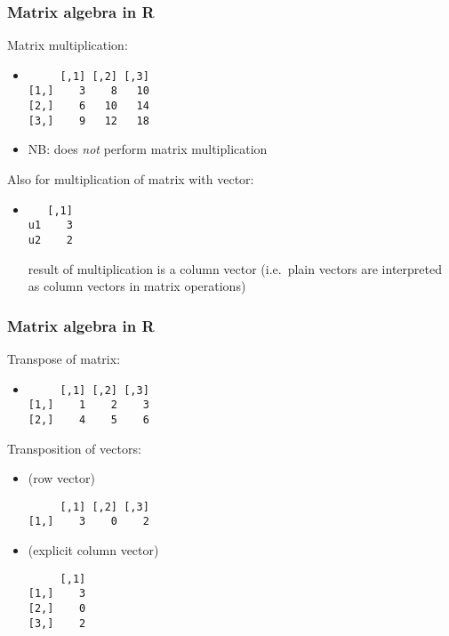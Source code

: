 \begin{frame}[containsverbatim]
  \frametitle{Matrix algebra in R}
  
  Matrix multiplication:
  \begin{itemize}
  \item {}
    \begin{footnotesize}
\begin{verbatim}
     [,1] [,2] [,3]
[1,]    3    8   10
[2,]    6   10   14
[3,]    9   12   18
\end{verbatim}
    \end{footnotesize}
  \item NB: \counterpoint{\texttt{*}} does \emph{not} perform matrix
    multiplication
  \end{itemize}

  \gap
  Also for multiplication of matrix with vector:
  \begin{itemize}
  \item {}
    \begin{footnotesize}
\begin{verbatim}
   [,1]
u1    3
u2    2
\end{verbatim}
    \end{footnotesize}
    \itemhand result of multiplication is a column vector (i.e.\ plain vectors
    are interpreted as column vectors in matrix operations)
  \end{itemize}
\end{frame}

\begin{frame}[containsverbatim]
  \frametitle{Matrix algebra in R}
  
  Transpose of matrix:
  \begin{itemize}
  \item {}
    \begin{footnotesize}
\begin{verbatim}
     [,1] [,2] [,3]
[1,]    1    2    3
[2,]    4    5    6
\end{verbatim}
    \end{footnotesize}
  \end{itemize}

  \gap
  Transposition of vectors:
  \begin{itemize}
  \item {} (row vector)
    \begin{footnotesize}
\begin{verbatim}
     [,1] [,2] [,3]
[1,]    3    0    2
\end{verbatim}
    \end{footnotesize}
    \gap
  \item {} (explicit column vector)
    \begin{footnotesize}
\begin{verbatim}
     [,1]
[1,]    3
[2,]    0
[3,]    2
\end{verbatim}
    \end{footnotesize}
  \end{itemize}
\end{frame}


